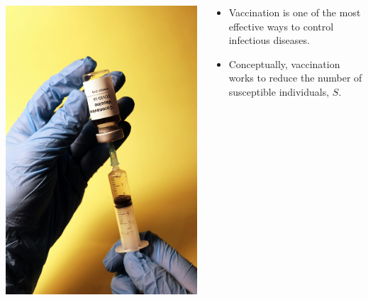 \documentclass[
  ignorenonframetext,
]{beamer}
\providecommand{\tightlist}{%
  \setlength{\itemsep}{0pt}\setlength{\parskip}{0pt}}\usepackage{longtable,booktabs,array}
\begin{document}
\begin{frame}
\begin{columns}[T]
\begin{column}{0.4\textwidth}
\includegraphics[width=1.5\textwidth,height=\textheight]{images/vaccine.jpeg}
\end{column}

\begin{column}{0.6\textwidth}
\begin{itemize}
\tightlist
\item
  Vaccination is one of the most effective ways to control infectious
  diseases.
\item
  Conceptually, vaccination works to reduce the number of susceptible
  individuals, \(S\).
\end{itemize}
\end{column}
\end{columns}
\end{frame}
\end{document}
